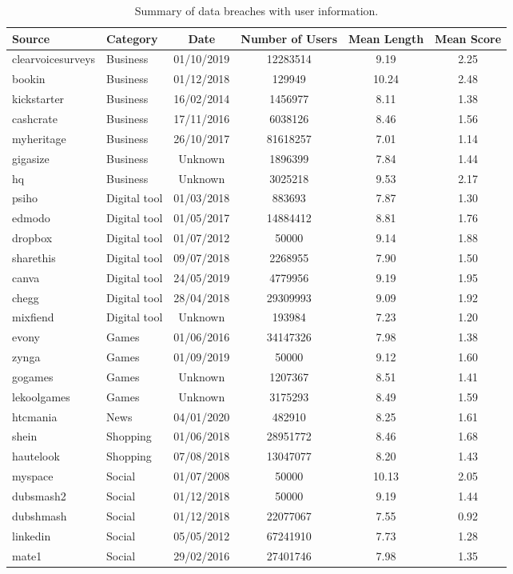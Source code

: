 \begin{table*}[h!]
\centering
\begin{tabular}{|l|l|c|c|c|c|}
\hline
\textbf{Source} & \textbf{Category} & \textbf{Date} & \textbf{Number of Users} & \textbf{Mean Length} & \textbf{Mean Score} \\
\hline
clearvoicesurveys & Business & 01/10/2019  & 12283514 & 9.19 & 2.25 \\
bookin & Business & 01/12/2018  & 129949 & 10.24 & 2.48 \\
kickstarter & Business & 16/02/2014  & 1456977 & 8.11 & 1.38 \\
cashcrate & Business & 17/11/2016  & 6038126 & 8.46 & 1.56 \\
myheritage & Business & 26/10/2017  & 81618257 & 7.01 & 1.14 \\
gigasize & Business & Unknown  & 1896399 & 7.84 & 1.44 \\
hq & Business & Unknown  & 3025218 & 9.53 & 2.17 \\
\hline
psiho & Digital tool & 01/03/2018  & 883693 & 7.87 & 1.30 \\
edmodo & Digital tool & 01/05/2017  & 14884412 & 8.81 & 1.76 \\
dropbox & Digital tool & 01/07/2012  & 50000 & 9.14 & 1.88 \\
sharethis & Digital tool & 09/07/2018  & 2268955 & 7.90 & 1.50 \\
canva & Digital tool & 24/05/2019  & 4779956 & 9.19 & 1.95 \\
chegg & Digital tool & 28/04/2018  & 29309993 & 9.09 & 1.92 \\
mixfiend & Digital tool & Unknown  & 193984 & 7.23 & 1.20 \\
\hline
evony & Games & 01/06/2016  & 34147326 & 7.98 & 1.38 \\
zynga & Games & 01/09/2019  & 50000 & 9.12 & 1.60 \\
gogames & Games & Unknown  & 1207367 & 8.51 & 1.41 \\
lekoolgames & Games & Unknown  & 3175293 & 8.49 & 1.59 \\
\hline
htcmania & News & 04/01/2020  & 482910 & 8.25 & 1.61 \\
\hline
shein & Shopping & 01/06/2018  & 28951772 & 8.46 & 1.68 \\
hautelook & Shopping & 07/08/2018  & 13047077 & 8.20 & 1.43 \\
\hline
myspace & Social & 01/07/2008  & 50000 & 10.13 & 2.05 \\
dubsmash2 & Social & 01/12/2018  & 50000 & 9.19 & 1.44 \\
dubshmash & Social & 01/12/2018  & 22077067 & 7.55 & 0.92 \\
linkedin & Social & 05/05/2012  & 67241910 & 7.73 & 1.28 \\
mate1 & Social & 29/02/2016  & 27401746 & 7.98 & 1.35 \\
\hline
\end{tabular}
\label{table:dataleaks}\caption{Summary of data breaches with user information.}
\end{table*}

